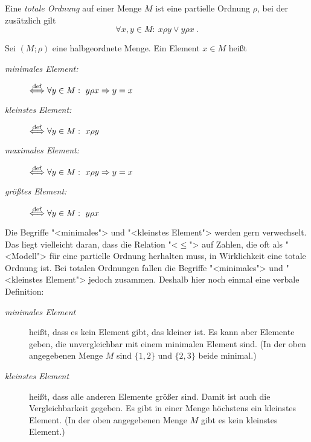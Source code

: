 \begin{definition}
  \label{def:total-order}
    Eine \emph{totale Ordnung} 
    auf einer Menge $M$ ist eine partielle Ordnung
    $\rho$, bei der zusätzlich gilt
    \[ \forall x,y \in M:\ x \rho y \vee y \rho x\ .\]
\end{definition}
\begin{definition}
    Sei $(M;\rho)$ eine halbgeordnete Menge. Ein Element $x \in M$ heißt
    \begin{description}
    \item[\it minimales Element:] $\stackrel{\rm def}{\Longleftrightarrow} \forall y \in M:\  y \rho x 
                                         \Rightarrow y=x$
    \item[\it kleinstes Element:] $\stackrel{\rm def}{\Longleftrightarrow} \forall y \in M:\  x \rho y$
    \item[\it maximales Element:] $\stackrel{\rm def}{\Longleftrightarrow} \forall y \in M:\  x \rho y 
                                         \Rightarrow y=x$
    \item[\it größtes Element:] $\stackrel{\rm def}{\Longleftrightarrow} \forall y \in M:\  y \rho x$
    \end{description}
\end{definition}

Die Begriffe "<minimales"> und 
"<kleinstes Element"> werden gern
verwechselt. Das liegt vielleicht daran, dass die Relation "<$\leq$"> auf
Zahlen, die oft als "<Modell"> für eine partielle Ordnung herhalten muss, in
Wirklichkeit eine totale Ordnung ist. Bei totalen Ordnungen fallen die Begriffe
"<minimales"> und "<kleinstes Element"> jedoch zusammen.
Deshalb hier noch einmal eine verbale Definition:
\begin{description}
\item[\it minimales Element] heißt, dass es kein Element gibt, das kleiner
             ist. Es kann aber Elemente geben, die unvergleichbar mit einem
             minimalen Element sind. (In der oben angegebenen Menge $M$ sind
             $\{1,2\}$ und $\{2,3\}$ beide minimal.)
\item[\it kleinstes Element] heißt, dass alle anderen Elemente größer
             sind. Damit ist auch die Vergleichbarkeit gegeben. Es gibt in einer
             Menge höchstens ein kleinstes Element. (In der oben
             angegebenen Menge $M$ gibt es kein kleinstes Element.)
\end{description}

